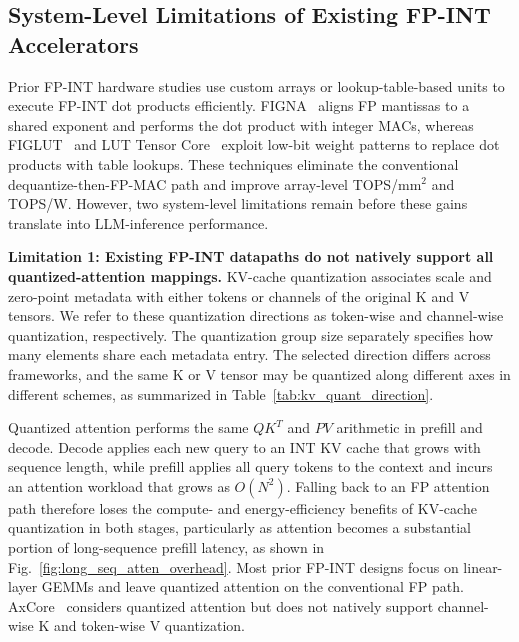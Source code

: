 \documentclass[sigconf,anonymous,nonacm]{acmart}
\newcommand{\fpint}{FP-INT}
\begin{document}

\subsection{System-Level Limitations of Existing FP-INT Accelerators}
\label{sec:sys_gap}

Prior \fpint{} hardware studies use custom arrays or lookup-table-based units to execute \fpint{} dot products efficiently. FIGNA~\cite{figna} aligns FP mantissas to a shared exponent and performs the dot product with integer MACs, whereas FIGLUT~\cite{figlut} and LUT Tensor Core~\cite{lut_tensor_core} exploit low-bit weight patterns to replace dot products with table lookups. These techniques eliminate the conventional dequantize-then-FP-MAC path and improve array-level TOPS/mm$^2$ and TOPS/W. However, two system-level limitations remain before these gains translate into LLM-inference performance.

\textbf{Limitation 1: Existing \fpint{} datapaths do not natively support all quantized-attention mappings.}
KV-cache quantization associates scale and zero-point metadata with either tokens or channels of the original K and V tensors. We refer to these quantization directions as token-wise and channel-wise quantization, respectively. The quantization group size separately specifies how many elements share each metadata entry. The selected direction differs across frameworks, and the same K or V tensor may be quantized along different axes in different schemes, as summarized in Table~\ref{tab:kv_quant_direction}.

Quantized attention performs the same $QK^T$ and $PV$ arithmetic in prefill and decode. Decode applies each new query to an INT KV cache that grows with sequence length, while prefill applies all query tokens to the context and incurs an attention workload that grows as $O(N^2)$. Falling back to an FP attention path therefore loses the compute- and energy-efficiency benefits of KV-cache quantization in both stages, particularly as attention becomes a substantial portion of long-sequence prefill latency, as shown in Fig.~\ref{fig:long_seq_atten_overhead}. Most prior \fpint{} designs focus on linear-layer GEMMs and leave quantized attention on the conventional FP path. 
AxCore~\cite{axcore} considers quantized attention but does not natively support channel-wise K and token-wise V quantization.
\end{document}
